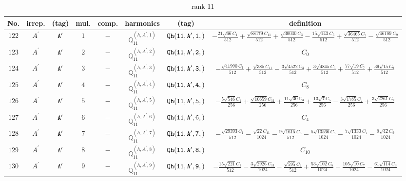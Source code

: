 \documentclass[fleqn,8pt]{jsarticle}
\begin{document}
\begin{table}[ht!]
\begin{center}
\caption{rank 11}
\renewcommand{\arraystretch}{1.3}
\begin{tabular}{cccccccc} \hline \hline
No. & irrep. & (tag) & mul. & comp. & harmonics & (tag) & definition \\ \hline
$ 122 $ & $ A^{\prime} $ & $ {\tt A'} $ & $ 1 $ & $ - $ & $ \mathbb{Q}_{11}^{(h,A^{\prime},1)} $ & $ {\tt Qh(11,A',1,)} $ & $ - \frac{21 \sqrt{66} C_{1}}{512} + \frac{\sqrt{88179} C_{11}}{512} + \frac{\sqrt{30030} C_{3}}{512} - \frac{15 \sqrt{143} C_{5}}{512} + \frac{\sqrt{36465} C_{7}}{512} - \frac{\sqrt{46189} C_{9}}{512} $ \\
$ 123 $ & $ A^{\prime} $ & $ {\tt A'} $ & $ 2 $ & $ - $ & $ \mathbb{Q}_{11}^{(h,A^{\prime},2)} $ & $ {\tt Qh(11,A',2,)} $ & $ C_{0} $ \\
$ 124 $ & $ A^{\prime} $ & $ {\tt A'} $ & $ 3 $ & $ - $ & $ \mathbb{Q}_{11}^{(h,A^{\prime},3)} $ & $ {\tt Qh(11,A',3,)} $ & $ - \frac{\sqrt{41990} C_{1}}{512} + \frac{\sqrt{385} C_{11}}{512} - \frac{3 \sqrt{4522} C_{3}}{512} + \frac{3 \sqrt{4845} C_{5}}{512} + \frac{77 \sqrt{19} C_{7}}{512} + \frac{39 \sqrt{15} C_{9}}{512} $ \\
$ 125 $ & $ A^{\prime} $ & $ {\tt A'} $ & $ 4 $ & $ - $ & $ \mathbb{Q}_{11}^{(h,A^{\prime},4)} $ & $ {\tt Qh(11,A',4,)} $ & $ C_{8} $ \\
$ 126 $ & $ A^{\prime} $ & $ {\tt A'} $ & $ 5 $ & $ - $ & $ \mathbb{Q}_{11}^{(h,A^{\prime},5)} $ & $ {\tt Qh(11,A',5,)} $ & $ - \frac{5 \sqrt{546} C_{1}}{256} + \frac{\sqrt{10659} C_{11}}{256} + \frac{11 \sqrt{30} C_{3}}{256} + \frac{13 \sqrt{7} C_{5}}{256} - \frac{3 \sqrt{1785} C_{7}}{256} + \frac{3 \sqrt{2261} C_{9}}{256} $ \\
$ 127 $ & $ A^{\prime} $ & $ {\tt A'} $ & $ 6 $ & $ - $ & $ \mathbb{Q}_{11}^{(h,A^{\prime},6)} $ & $ {\tt Qh(11,A',6,)} $ & $ C_{4} $ \\
$ 128 $ & $ A^{\prime} $ & $ {\tt A'} $ & $ 7 $ & $ - $ & $ \mathbb{Q}_{11}^{(h,A^{\prime},7)} $ & $ {\tt Qh(11,A',7,)} $ & $ - \frac{\sqrt{29393} C_{1}}{512} - \frac{\sqrt{22} C_{11}}{1024} - \frac{9 \sqrt{1615} C_{3}}{512} - \frac{5 \sqrt{13566} C_{5}}{1024} - \frac{7 \sqrt{1330} C_{7}}{1024} - \frac{9 \sqrt{42} C_{9}}{1024} $ \\
$ 129 $ & $ A^{\prime} $ & $ {\tt A'} $ & $ 8 $ & $ - $ & $ \mathbb{Q}_{11}^{(h,A^{\prime},8)} $ & $ {\tt Qh(11,A',8,)} $ & $ C_{10} $ \\
$ 130 $ & $ A^{\prime} $ & $ {\tt A'} $ & $ 9 $ & $ - $ & $ \mathbb{Q}_{11}^{(h,A^{\prime},9)} $ & $ {\tt Qh(11,A',9,)} $ & $ - \frac{15 \sqrt{221} C_{1}}{512} - \frac{3 \sqrt{2926} C_{11}}{1024} - \frac{\sqrt{595} C_{3}}{512} + \frac{53 \sqrt{102} C_{5}}{1024} - \frac{105 \sqrt{10} C_{7}}{1024} - \frac{61 \sqrt{114} C_{9}}{1024} $ \\

\end{tabular}
\end{center}
\end{table}
\end{document}
